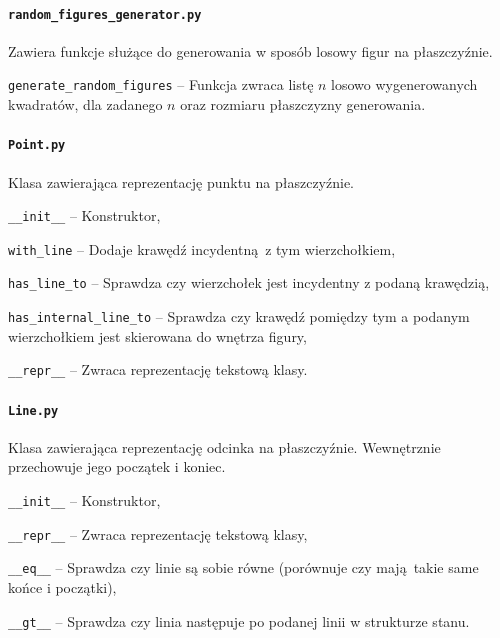 \documentclass[12pt]{article}
\let\tempone\itemize
\let\temptwo\enditemize
\renewenvironment{itemize}{\tempone\setlength{\itemsep}{0cm}}{\temptwo}
\begin{document}
	\paragraph{\lstinline|random_figures_generator.py|}
		Zawiera funkcje służące do generowania w sposób losowy figur na płaszczyźnie.
		\begin{itemize}
			\item \lstinline|generate_random_figures| -- Funkcja zwraca listę $ n $ losowo wygenerowanych kwadratów, dla zadanego $ n $ oraz rozmiaru płaszczyzny generowania.
		\end{itemize}
	
	\paragraph{\lstinline|Point.py|}
		Klasa zawierająca reprezentację punktu na płaszczyźnie.
		\begin{itemize}
			\item \lstinline|__init__| -- Konstruktor,
			\item \lstinline|with_line| -- Dodaje krawędź incydentną z tym wierzchołkiem,
			\item \lstinline|has_line_to| -- Sprawdza czy wierzchołek jest incydentny z podaną krawędzią,
			\item \lstinline|has_internal_line_to| -- Sprawdza czy krawędź pomiędzy tym a podanym wierzchołkiem jest skierowana do wnętrza figury, 
			\item \lstinline|__repr__| -- Zwraca reprezentację tekstową klasy.
		\end{itemize}
	
	\paragraph{\lstinline|Line.py|}
		Klasa zawierająca reprezentację odcinka na płaszczyźnie. Wewnętrznie przechowuje jego początek i koniec.
		\begin{itemize}
			\item \lstinline|__init__| -- Konstruktor,
			\item \lstinline|__repr__| -- Zwraca reprezentację tekstową klasy,
			\item \lstinline|__eq__| -- Sprawdza czy linie są sobie równe (porównuje czy mają takie same końce i początki),
			\item \lstinline|__gt__| -- Sprawdza czy linia następuje po podanej linii w strukturze stanu.
		\end{itemize}
	
\end{document}
